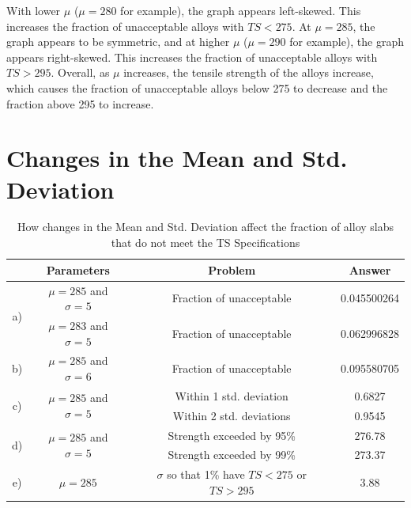 \documentclass[letterpaper]{article}
\begin{document}
With lower $\mu$ ($\mu=280$ for example), the graph appears left-skewed. This
increases the fraction of unacceptable alloys with $TS < 275$. At $\mu=285$, the
graph appears to be symmetric, and at higher $\mu$ ($\mu=290$ for example), the
graph appears right-skewed. This increases the fraction of unacceptable alloys
with $TS > 295$. Overall, as $\mu$ increases, the tensile strength of the alloys
increase, which causes the fraction  of unacceptable alloys below 275 to
decrease and the fraction above 295 to increase.


\section{Changes in the Mean and Std. Deviation} %

\begin{table}[H]
 \centering
 \begin{tabular}{c|c|c|c|}
                      & Parameters                                & Problem                                            & Answer      \\ \hline
  \multirow{2}{*}{a)} & $\mu=285$ and $\sigma=5$                  & Fraction of unacceptable                           & 0.045500264 \\ \cline{2-4}
                      & $\mu=283$ and $\sigma=5$                  & Fraction of unacceptable                           & 0.062996828 \\ \hline
  b)                  & $\mu=285$ and $\sigma=6$                  & Fraction of unacceptable                           & 0.095580705 \\ \hline
  \multirow{2}{*}{c)} & \multirow{2}{*}{$\mu=285$ and $\sigma=5$} & Within 1 std. deviation                            & 0.6827      \\ \cline{3-4}
                      &                                           & Within 2 std. deviations                           & 0.9545      \\ \hline
  \multirow{2}{*}{d)} & \multirow{2}{*}{$\mu=285$ and $\sigma=5$} & Strength exceeded by 95\%                          & 276.78      \\ \cline{3-4}
                      &                                           & Strength exceeded by 99\%                          & 273.37      \\ \hline
  e)                  & $\mu=285$                                 & $\sigma$ so that 1\% have $TS < 275$ or $TS > 295$ & 3.88        \\ \hline
 \end{tabular}
 \caption{How changes in the Mean and Std. Deviation affect the fraction of alloy slabs that do not meet the TS Specifications}
 \label{q2}
\end{table}
\end{document}

